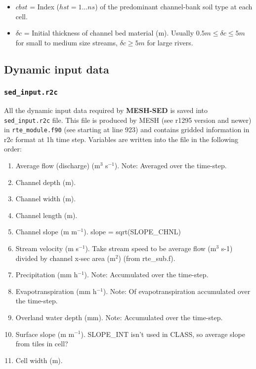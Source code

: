 \documentclass[12pt, letterpaper]{article}
\newcommand{\ms}{\textbf{MESH-SED} }
\begin{document}
{\scriptsize 
\begin{itemize}
\item $cbst$ =  Index ($hst = 1 ... ns$) of the predominant channel-bank soil type at each cell.
\item $\delta c$ =  Initial thickness of channel bed material (m). Usually $0.5m \leq \delta c \leq 5m$ for small to medium size streams, $\delta c \geq 5m$ for large rivers.
\end{itemize}
}

\subsection{Dynamic input data}
\subsubsection{\texttt{sed\_input.r2c}}
All the dynamic input data required by \ms is saved into \texttt{sed\_input.r2c} file. This file is produced by MESH (see r1295 version and newer) in \texttt{rte\_module.f90} (see starting at line 923) and contains gridded information in r2c format at 1h time step. Variables are written into the file in the following order: 
{\scriptsize
\begin{enumerate}
\item Average flow (discharge) (m$^{3}$ s$^{-1}$). Note: Averaged over the time-step.
\item Channel depth (m).
\item Channel width (m).
\item Channel length (m).
\item Channel slope (m m$^{-1}$). slope = sqrt(SLOPE\_CHNL)
\item Stream velocity (m s$^{-1}$). Take stream speed to be average flow (m$^{3}$ s-1) divided by channel x-sec area (m$^{2}$) (from rte\_sub.f).
\item Precipitation (mm h$^{-1}$). Note: Accumulated over the time-step.
\item Evapotranspiration (mm h$^{-1}$). Note: Of evapotranspiration accumulated over the time-step.
\item Overland water depth (mm). Note: Accumulated over the time-step.
\item Surface slope (m m$^{-1}$). SLOPE\_INT isn't used in CLASS, so average slope from tiles in cell?
\item Cell width (m).
\end{enumerate}
}
\end{document}
